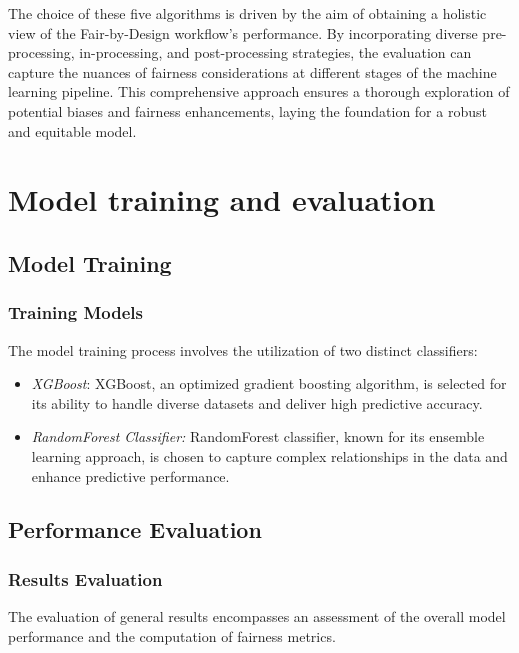 The choice of these five algorithms is driven by the aim of obtaining a holistic view of the Fair-by-Design workflow's performance. By incorporating diverse pre-processing, in-processing, and post-processing strategies, the evaluation can capture the nuances of fairness considerations at different stages of the machine learning pipeline. This comprehensive approach ensures a thorough exploration of potential biases and fairness enhancements, laying the foundation for a robust and equitable model.

\section{Model training and evaluation}
\label{section:val_mt_eval}

\subsection{Model Training}

\subsubsection{Training Models}

The model training process involves the utilization of two distinct classifiers:

\begin{itemize}

    \item \emph{XGBoost}: XGBoost, an optimized gradient boosting algorithm, is selected for its ability to handle diverse datasets and deliver high predictive accuracy.

    \item \emph{RandomForest Classifier:} RandomForest classifier, known for its ensemble learning approach, is chosen to capture complex relationships in the data and enhance predictive performance.

\end{itemize}


\subsection{Performance Evaluation}

\subsubsection{Results Evaluation}

The evaluation of general results encompasses an assessment of the overall model performance and the computation of fairness metrics.

